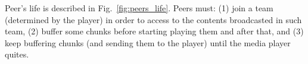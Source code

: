 \label{sec:peers_life}

\begin{figure*}
   \caption{Main actions carried out by a
    peer.\label{fig:peers_life}}
\end{figure*}

Peer's life is described in Fig.~\ref{fig:peers_life}. Peers must: (1)
join a team (determined by the player) in order to access to the
contents broadcasted in such team, (2) buffer some chunks before
starting playing them and after that, and (3) keep buffering chunks
(and sending them to the player) until the media player quites.
